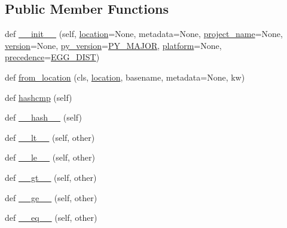 \subsection*{Public Member Functions}
\begin{DoxyCompactItemize}
\item 
def \hyperlink{classpkg__resources_1_1Distribution_af4cf119ffe7fc00fceb8409576da4515}{\+\_\+\+\_\+init\+\_\+\+\_\+} (self, \hyperlink{classpkg__resources_1_1Distribution_a48f64f0791d0dffea14e22b9dbc210b3}{location}=None, metadata=None, \hyperlink{classpkg__resources_1_1Distribution_a5a41ba765e57c1fe39b6405c2dff69c7}{project\+\_\+name}=None, \hyperlink{classpkg__resources_1_1Distribution_a454a1c3eae52dee89980a24d7c67f036}{version}=None, \hyperlink{classpkg__resources_1_1Distribution_a94c84ff74167eef63fecce9f5e3c2a85}{py\+\_\+version}=\hyperlink{namespacepkg__resources_a27901fd744697f2b2d55b6f1255cf020}{P\+Y\+\_\+\+M\+A\+J\+OR}, \hyperlink{classpkg__resources_1_1Distribution_a0d3120e21ef127c42294a9ad2149613d}{platform}=None, \hyperlink{classpkg__resources_1_1Distribution_afaa162e116709a2b7f4d5e2cd2f4bdcc}{precedence}=\hyperlink{namespacepkg__resources_a5a0f6c722896ed99cec71096149b840f}{E\+G\+G\+\_\+\+D\+I\+ST})
\item 
def \hyperlink{classpkg__resources_1_1Distribution_a7db6e534e7f8c78b8b3c5f7ddf7140e7}{from\+\_\+location} (cls, \hyperlink{classpkg__resources_1_1Distribution_a48f64f0791d0dffea14e22b9dbc210b3}{location}, basename, metadata=None, kw)
\item 
def \hyperlink{classpkg__resources_1_1Distribution_a16b94190b3911d7be073c9a473ea7ba7}{hashcmp} (self)
\item 
def \hyperlink{classpkg__resources_1_1Distribution_a719236d2f5d14307bfeb2a938c0189f8}{\+\_\+\+\_\+hash\+\_\+\+\_\+} (self)
\item 
def \hyperlink{classpkg__resources_1_1Distribution_ab148ba7f4c9a47f11cac36e459757602}{\+\_\+\+\_\+lt\+\_\+\+\_\+} (self, other)
\item 
def \hyperlink{classpkg__resources_1_1Distribution_ad2180c10395605c21a866120be4f9429}{\+\_\+\+\_\+le\+\_\+\+\_\+} (self, other)
\item 
def \hyperlink{classpkg__resources_1_1Distribution_a8ec8b515a344963d6d4e6ee613e3a52a}{\+\_\+\+\_\+gt\+\_\+\+\_\+} (self, other)
\item 
def \hyperlink{classpkg__resources_1_1Distribution_afb04dbdaaa0e0bacfd91096c96f53d7e}{\+\_\+\+\_\+ge\+\_\+\+\_\+} (self, other)
\item 
def \hyperlink{classpkg__resources_1_1Distribution_a93748efe590a957435e081257500f139}{\+\_\+\+\_\+eq\+\_\+\+\_\+} (self, other)

\end{DoxyCompactItemize}
